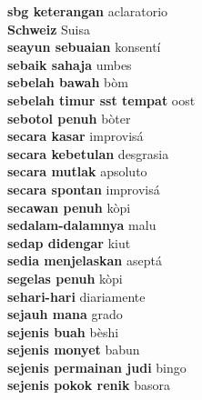 \textbf{ sbg keterangan  } aclaratorio \\
\textbf{ Schweiz  } Suisa \\
\textbf{ seayun sebuaian  } konsentí \\
\textbf{ sebaik sahaja  } umbes \\
\textbf{ sebelah bawah  } bòm \\
\textbf{ sebelah timur sst tempat  } oost \\
\textbf{ sebotol penuh  } bòter \\
\textbf{ secara kasar  } improvisá \\
\textbf{ secara kebetulan  } desgrasia \\
\textbf{ secara mutlak  } apsoluto \\
\textbf{ secara spontan  } improvisá \\
\textbf{ secawan penuh  } kòpi \\
\textbf{ sedalam-dalamnya  } malu \\
\textbf{ sedap didengar  } kiut \\
\textbf{ sedia menjelaskan  } aseptá \\
\textbf{ segelas penuh  } kòpi \\
\textbf{ sehari-hari  } diariamente \\
\textbf{ sejauh mana  } grado \\
\textbf{ sejenis buah  } bèshi \\
\textbf{ sejenis monyet  } babun \\
\textbf{ sejenis permainan judi  } bingo \\
\textbf{ sejenis pokok renik  } basora \\
